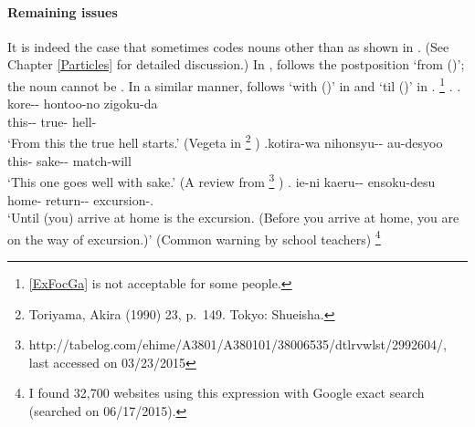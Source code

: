 \paragraph{Remaining issues}

It is indeed the case that
 sometimes codes nouns other than 
as shown in \Next.
(See Chapter \ref{Particles} for detailed discussion.)
In \Next[a],  follows the postposition  `from ()';
the noun cannot be .
In a similar manner,
 follows  `with ()' in \Next[b] and
 `til ()' in \Next[c].%
 \footnote{\ref{ExFocGa} is not acceptable for some people.}
%
\ex.
 \ag. kore-- hontoo-no zigoku-da \\
      this-- true- hell- \\
      `From this the true hell starts.'
      \hfill{(Vegeta in %
      \footnote{
      Toriyama, Akira (1990)  23, p.~149. Tokyo: Shueisha.
      }
      )}
 \bg.\label{ExFocGa}kotira-wa nihonsyu-- au-desyoo \\
      this- sake-- match-will \\
      `This one goes well with sake.'
      \hfill{(A review from %
       \footnote{http://tabelog.com/ehime/A3801/A380101/38006535/dtlrvwlst/2992604/, last accessed on 03/23/2015}
      )}
  \bg. ie-ni kaeru-- ensoku-desu \\
       home- return-- excursion-. \\
       `Until (you) arrive at home is the excursion. (Before you arrive at home, you are on the way of excursion.)'
       \hfill{(Common warning by school teachers)}%
       \footnote{
       I found 32,700 websites using this expression with Google exact search (searched on 06/17/2015).
       }

